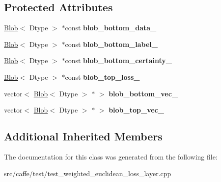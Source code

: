 \subsection*{Protected Attributes}
\begin{DoxyCompactItemize}
\item 
\mbox{\label{classcaffe_1_1_weighted_euclidean_loss_layer_test_a7f0bce7f07d854a2003d09f66e50d3e9}} 
\mbox{\hyperlink{classcaffe_1_1_blob}{Blob}}$<$ Dtype $>$ $\ast$const {\bfseries blob\+\_\+bottom\+\_\+data\+\_\+}
\item 
\mbox{\label{classcaffe_1_1_weighted_euclidean_loss_layer_test_aa9952fbbf77a3f0eb9c87abe77b1ed04}} 
\mbox{\hyperlink{classcaffe_1_1_blob}{Blob}}$<$ Dtype $>$ $\ast$const {\bfseries blob\+\_\+bottom\+\_\+label\+\_\+}
\item 
\mbox{\label{classcaffe_1_1_weighted_euclidean_loss_layer_test_a2f887a7ea7c481a6e62453ac0ace3965}} 
\mbox{\hyperlink{classcaffe_1_1_blob}{Blob}}$<$ Dtype $>$ $\ast$const {\bfseries blob\+\_\+bottom\+\_\+certainty\+\_\+}
\item 
\mbox{\label{classcaffe_1_1_weighted_euclidean_loss_layer_test_a9951e3238448b827ae2d3c59939b07a0}} 
\mbox{\hyperlink{classcaffe_1_1_blob}{Blob}}$<$ Dtype $>$ $\ast$const {\bfseries blob\+\_\+top\+\_\+loss\+\_\+}
\item 
\mbox{\label{classcaffe_1_1_weighted_euclidean_loss_layer_test_a43dda5a55ede71b475351b703b5597c9}} 
vector$<$ \mbox{\hyperlink{classcaffe_1_1_blob}{Blob}}$<$ Dtype $>$ $\ast$ $>$ {\bfseries blob\+\_\+bottom\+\_\+vec\+\_\+}
\item 
\mbox{\label{classcaffe_1_1_weighted_euclidean_loss_layer_test_ae62517d76e42a44867f83aad2eb9922d}} 
vector$<$ \mbox{\hyperlink{classcaffe_1_1_blob}{Blob}}$<$ Dtype $>$ $\ast$ $>$ {\bfseries blob\+\_\+top\+\_\+vec\+\_\+}
\end{DoxyCompactItemize}
\subsection*{Additional Inherited Members}


The documentation for this class was generated from the following file\+:\begin{DoxyCompactItemize}
\item 
src/caffe/test/test\+\_\+weighted\+\_\+euclidean\+\_\+loss\+\_\+layer.\+cpp\end{DoxyCompactItemize}
